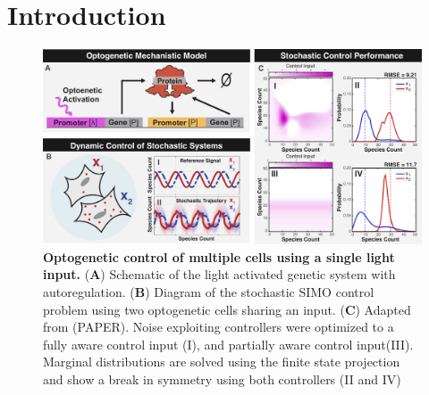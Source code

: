 \documentclass[12pt]{iopart}
\begin{document}
\section{Introduction}
\begin{figure}
\begin{center}
\includegraphics[width=\columnwidth]{Cartoons.pdf}
\caption{{\bf Optogenetic control of multiple cells using a single light input.}
({\bf A}) Schematic of the light activated genetic system with autoregulation.
({\bf B}) Diagram of the stochastic SIMO control problem using two optogenetic cells sharing an input.
({\bf C}) Adapted from (PAPER). Noise exploiting controllers were optimized to a fully aware control input (I), and partially aware control input(III). Marginal distributions are solved using the finite state projection and show a break in symmetry using both controllers (II and IV) }
\label{cartoons}
\end{center}
\vspace{-0.3in}
\end{figure}
\end{document}
